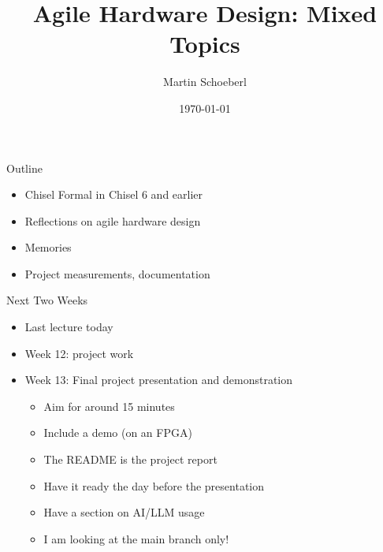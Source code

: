 

\newif\ifbook


\usepackage{tikz}
\usetikzlibrary{positioning, arrows.meta}


\title{Agile Hardware Design: Mixed Topics}
\author{Martin Schoeberl}
\date{\today}



\begin{frame}
\titlepage
\end{frame}




\begin{frame}[fragile]{Outline}
\begin{itemize}
\item Chisel Formal in Chisel 6 and earlier
\item Reflections on agile hardware design
\item Memories
\item Project measurements, documentation
\end{itemize}
\end{frame}

\begin{frame}[fragile]{Next Two Weeks}
\begin{itemize}
\item Last lecture today
\item Week 12: project work
\item Week 13: Final project presentation and demonstration
\begin{itemize}
\item Aim for around 15 minutes
\item Include a demo (on an FPGA)
\item The README is the project report
\item Have it ready the day before the presentation
\item Have a section on AI/LLM usage
\item I am looking at the main branch only!
\end{itemize}
\end{itemize}
\end{frame}


